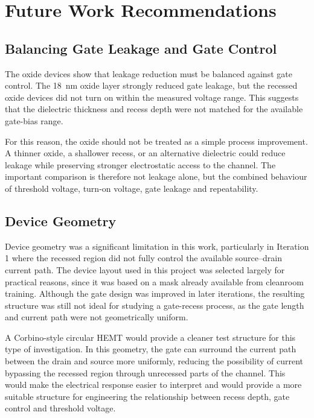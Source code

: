 \chapter{Future Work Recommendations}
\label{ch:future-work}

\section{Balancing Gate Leakage and Gate Control}

The oxide devices show that leakage reduction must be balanced against gate
control. The \SI{18}{\nano\metre} oxide layer strongly reduced gate leakage, but
the recessed oxide devices did not turn on within the measured voltage range.
This suggests that the dielectric thickness and recess depth were not matched
for the available gate-bias range.

For this reason, the oxide should not be treated as a simple process
improvement. A thinner oxide, a shallower recess, or an alternative dielectric
could reduce leakage while preserving stronger electrostatic access to the
channel. The important comparison is therefore not leakage alone, but the
combined behaviour of threshold voltage, turn-on voltage, gate leakage and
repeatability.

\section{Device Geometry}

Device geometry was a significant limitation in this work, particularly in
Iteration 1 where the recessed region did not fully control the available
source--drain current path. The device layout used in this project was selected
largely for practical reasons, since it was based on a mask already available
from cleanroom training. Although the gate design was improved in later
iterations, the resulting structure was still not ideal for studying a
gate-recess process, as the gate length and current path were not geometrically
uniform.

A Corbino-style circular HEMT would provide a cleaner test structure for this
type of investigation. In this geometry, the gate can surround the current path
between the drain and source more uniformly, reducing the possibility of current
bypassing the recessed region through unrecessed parts of the channel. This
would make the electrical response easier to interpret and would provide a more
suitable structure for engineering the relationship between recess depth, gate
control and threshold voltage.

